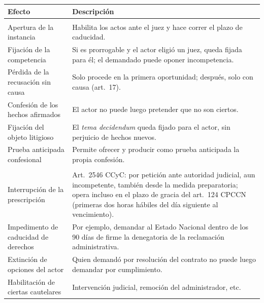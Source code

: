 \documentclass[12pt,oneside]{book}
\renewcommand{\arraystretch}{1.15}
\begin{document}
\begin{table}[H]
\centering
\renewcommand{\arraystretch}{1.2}
\begin{tabularx}{\textwidth}{>{\RaggedRight\arraybackslash}p{}>{\RaggedRight\arraybackslash}X}
\toprule
\textbf{Efecto} & \textbf{Descripción} \\
\midrule
\multicolumn{2}{l}{\textit{Procesales}} \\
Apertura de la instancia & Habilita los actos ante el juez y hace correr el plazo de caducidad. \\
Fijación de la competencia & Si es prorrogable y el actor eligió un juez, queda fijada para él; el demandado puede oponer incompetencia. \\
Pérdida de la recusación sin causa & Solo procede en la primera oportunidad; después, solo con causa (art.~17). \\
Confesión de los hechos afirmados & El actor no puede luego pretender que no son ciertos. \\
Fijación del objeto litigioso & El \textit{tema decidendum} queda fijado para el actor, sin perjuicio de hechos nuevos. \\
Prueba anticipada confesional & Permite ofrecer y producir como prueba anticipada la propia confesión. \\
\addlinespace
\multicolumn{2}{l}{\textit{Sustanciales}} \\
Interrupción de la prescripción & Art.~2546 CCyC: por petición ante autoridad judicial, aun incompetente, también desde la medida preparatoria; opera incluso en el plazo de gracia del art.~124 CPCCN (primeras dos horas hábiles del día siguiente al vencimiento). \\
Impedimento de caducidad de derechos & Por ejemplo, demandar al Estado Nacional dentro de los 90 días de firme la denegatoria de la reclamación administrativa. \\
Extinción de opciones del actor & Quien demandó por resolución del contrato no puede luego demandar por cumplimiento. \\
Habilitación de ciertas cautelares & Intervención judicial, remoción del administrador, etc. \\
\bottomrule
\end{tabularx}
\end{table}

\end{document}

